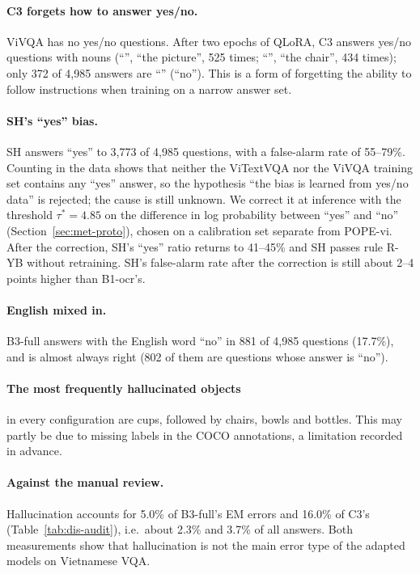 \paragraph{C3 forgets how to answer yes/no.} ViVQA has no yes/no questions. After two
epochs of QLoRA, C3 answers yes/no questions with nouns (``'', ``the picture'',
525 times; ``'', ``the chair'', 434 times); only 372 of 4,985 answers are
``'' (``no''). This is a form of forgetting the ability to follow instructions
when training on a narrow answer set.

\paragraph{SH's ``yes'' bias.} SH answers ``yes'' to 3,773 of 4,985 questions, with a
false-alarm rate of 55--79\%. Counting in the data shows that neither the ViTextVQA nor the
ViVQA training set contains any ``yes'' answer, so the hypothesis ``the bias is learned from
yes/no data'' is rejected; the cause is still unknown. We correct it at inference with
the threshold $\tau^* = 4.85$ on the difference in log probability between ``yes'' and
``no'' (Section~\ref{sec:met-proto}), chosen on a calibration set separate from POPE-vi.
After the correction, SH's ``yes'' ratio returns to 41--45\% and SH passes rule R-YB without
retraining. SH's false-alarm rate after the correction is still about 2--4 points higher than
B1-ocr's.

\paragraph{English mixed in.} B3-full answers with the English word ``no'' in 881 of 4,985
questions (17.7\%), and is almost always right (802 of them are questions whose answer is
``no'').

\paragraph{The most frequently hallucinated objects} in every configuration are cups,
followed by chairs, bowls and bottles. This may partly be due to missing labels in the COCO
annotations, a limitation recorded in advance.

\paragraph{Against the manual review.} Hallucination accounts for 5.0\% of B3-full's EM
errors and 16.0\% of C3's (Table~\ref{tab:dis-audit}), i.e.\ about 2.3\% and 3.7\% of all
answers. Both measurements show that hallucination is not the main error type of the adapted
models on Vietnamese VQA.

